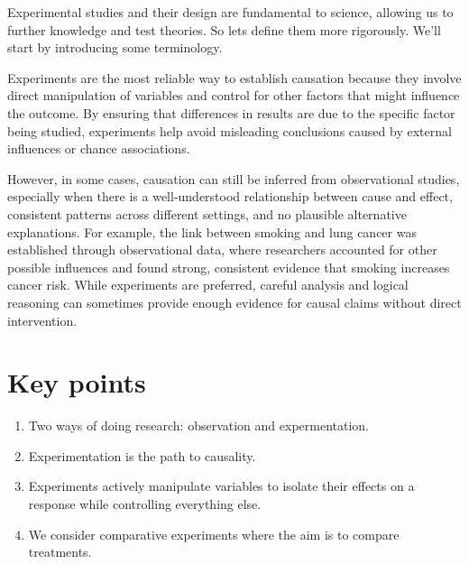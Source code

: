 \documentclass[
  letterpaper,
]{book}
\providecommand{\tightlist}{%
  \setlength{\itemsep}{0pt}\setlength{\parskip}{0pt}}\usepackage{longtable,booktabs,array}
\begin{document}
Experimental studies and their design are fundamental to science,
allowing us to further knowledge and test theories. So lets define them
more rigorously. We'll start by introducing some terminology.

\begin{tcolorbox}[enhanced jigsaw, opacitybacktitle=0.6, colbacktitle=quarto-callout-warning-color!10!white, toprule=.15mm, bottomtitle=1mm, breakable, leftrule=.75mm, rightrule=.15mm, left=2mm, colback=white, coltitle=black, toptitle=1mm, colframe=quarto-callout-warning-color-frame, bottomrule=.15mm, title={Establishing causality through observation is possible, but a bit more
difficult.}, arc=.35mm, titlerule=0mm, opacityback=0]

Experiments are the most reliable way to establish causation because
they involve direct manipulation of variables and control for other
factors that might influence the outcome. By ensuring that differences
in results are due to the specific factor being studied, experiments
help avoid misleading conclusions caused by external influences or
chance associations.

However, in some cases, causation can still be inferred from
observational studies, especially when there is a well-understood
relationship between cause and effect, consistent patterns across
different settings, and no plausible alternative explanations. For
example, the link between smoking and lung cancer was established
through observational data, where researchers accounted for other
possible influences and found strong, consistent evidence that smoking
increases cancer risk. While experiments are preferred, careful analysis
and logical reasoning can sometimes provide enough evidence for causal
claims without direct intervention.

\end{tcolorbox}

\section*{Key points}\label{key-points}


\begin{enumerate}
\def\labelenumi{\arabic{enumi}.}
\tightlist
\item
  Two ways of doing research: observation and expermentation.
\item
  Experimentation is the path to causality.
\item
  Experiments actively manipulate variables to isolate their effects on
  a response while controlling everything else.
\item
  We consider comparative experiments where the aim is to compare
  treatments.
\end{enumerate}
\end{document}
